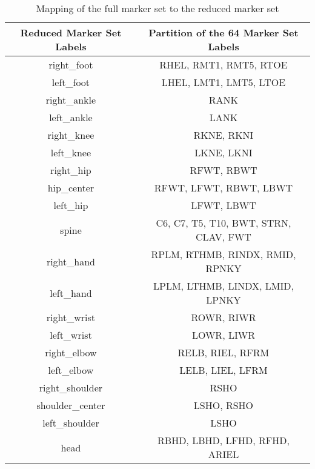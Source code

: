 \begin{table}[H]
    \centering
    \begin{tabular}{||c||c||}
        \hline
        \textbf{Reduced Marker Set Labels} & \textbf{Partition of the 64 Marker Set Labels} \\
        \hline
        right\_foot & RHEL, RMT1, RMT5, RTOE \\
        left\_foot & LHEL, LMT1, LMT5, LTOE \\
        right\_ankle & RANK \\
        left\_ankle & LANK \\
        right\_knee & RKNE, RKNI \\
        left\_knee & LKNE, LKNI \\
        right\_hip & RFWT, RBWT \\
        hip\_center & RFWT, LFWT, RBWT, LBWT \\
        left\_hip & LFWT, LBWT \\
        spine & C6, C7, T5, T10, BWT, STRN, CLAV, FWT \\
        right\_hand & RPLM, RTHMB, RINDX, RMID, RPNKY\\
        left\_hand & LPLM, LTHMB, LINDX, LMID, LPNKY \\
        right\_wrist & ROWR, RIWR \\
        left\_wrist & LOWR, LIWR \\
        right\_elbow & RELB, RIEL, RFRM\\
        left\_elbow & LELB, LIEL, LFRM \\
        right\_shoulder & RSHO \\
        shoulder\_center & LSHO, RSHO \\
        left\_shoulder & LSHO \\
        head & RBHD, LBHD, LFHD, RFHD, ARIEL \\
        \hline
    \end{tabular}
    \caption{Mapping of the full marker set to the reduced marker set}
    \label{tab:marker_mapping_64}
\end{table}

\clearpage
